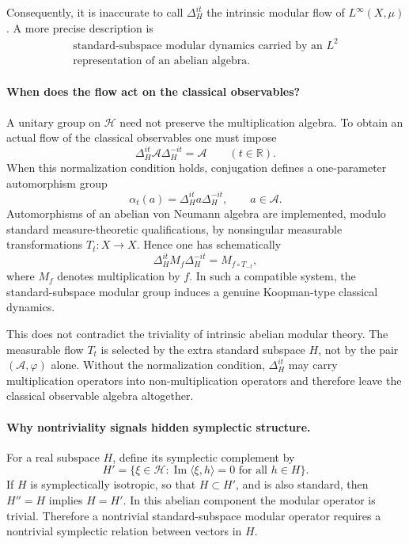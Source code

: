 \documentclass[a4paper,11pt]{article}
\theoremstyle{definition}
\newcommand{\cH}{\mathcal{H}}
\begin{document}
Consequently, it is inaccurate to call \(\Delta_H^{it}\) the intrinsic modular flow of \(L^\infty(X,\mu)\). A more precise description is
\[
    \boxed{\begin{gathered}
    \text{standard-subspace modular dynamics carried by an }L^2\\
    \text{representation of an abelian algebra}.
    \end{gathered}}
\]

\paragraph{When does the flow act on the classical observables?}
A unitary group on \(\cH\) need not preserve the multiplication algebra. To obtain an actual flow of the classical observables one must impose
\[
    \Delta_H^{it}\mathcal{A}\Delta_H^{-it}=\mathcal{A}
    \qquad (t\in\mathbb{R}).
\]
When this normalization condition holds, conjugation defines a one-parameter automorphism group
\[
    \alpha_t(a)=\Delta_H^{it}a\Delta_H^{-it},
    \qquad a\in\mathcal{A}.
\]
Automorphisms of an abelian von Neumann algebra are implemented, modulo standard measure-theoretic qualifications, by nonsingular measurable transformations \(T_t:X\to X\). Hence one has schematically
\[
    \Delta_H^{it}M_f\Delta_H^{-it}
    =M_{f\circ T_{-t}},
\]
where \(M_f\) denotes multiplication by \(f\). In such a compatible system, the standard-subspace modular group induces a genuine Koopman-type classical dynamics.

This does not contradict the triviality of intrinsic abelian modular theory. The measurable flow \(T_t\) is selected by the extra standard subspace \(H\), not by the pair \((\mathcal{A},\varphi)\) alone. Without the normalization condition, \(\Delta_H^{it}\) may carry multiplication operators into non-multiplication operators and therefore leave the classical observable algebra altogether.

\paragraph{Why nontriviality signals hidden symplectic structure.}
For a real subspace \(H\), define its symplectic complement by
\[
    H'=\{\xi\in\cH:\operatorname{Im}\langle\xi,h\rangle=0
    \text{ for all }h\in H\}.
\]
If \(H\) is symplectically isotropic, so that \(H\subset H'\), and is also standard, then \(H''=H\) implies \(H=H'\). In this abelian component the modular operator is trivial. Therefore a nontrivial standard-subspace modular operator requires a nontrivial symplectic relation between vectors in \(H\).
\end{document}
